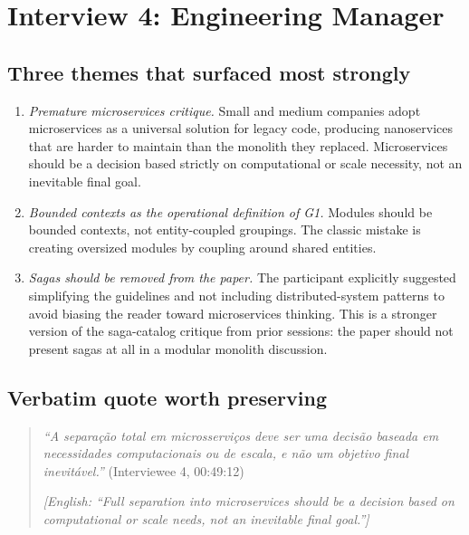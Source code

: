 
\section{Interview 4: Engineering Manager}
\label{sec:interview04}

\subsection*{Three themes that surfaced most strongly}

\begin{enumerate}[itemsep=3pt,topsep=2pt]
  \item \emph{Premature microservices critique.} Small and medium companies adopt microservices as a universal solution for legacy code, producing nanoservices that are harder to maintain than the monolith they replaced. Microservices should be a decision based strictly on computational or scale necessity, not an inevitable final goal.
  \item \emph{Bounded contexts as the operational definition of G1.} Modules should be bounded contexts, not entity-coupled groupings. The classic mistake is creating oversized modules by coupling around shared entities.
  \item \emph{Sagas should be removed from the paper.} The participant explicitly suggested simplifying the guidelines and not including distributed-system patterns to avoid biasing the reader toward microservices thinking. This is a stronger version of the saga-catalog critique from prior sessions: the paper should not present sagas at all in a modular monolith discussion.
\end{enumerate}

\subsection*{Verbatim quote worth preserving}

\begin{quote}
\emph{``A separação total em microsserviços deve ser uma decisão baseada em necessidades computacionais ou de escala, e não um objetivo final inevitável.''} (Interviewee 4, 00:49:12)

\medskip

\emph{[English: ``Full separation into microservices should be a decision based on computational or scale needs, not an inevitable final goal.'']}
\end{quote}

